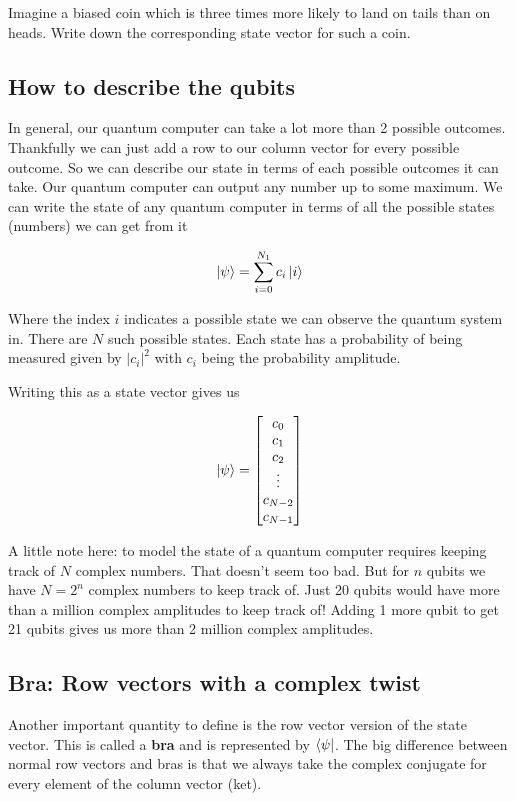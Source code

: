 \documentclass{book}
\begin{document}
Imagine a biased coin which is three times more likely to land on tails than on heads. Write down the corresponding state vector for such a coin.

\hline
\subsection{How to describe the qubits}

In general, our quantum computer can take a lot more than 2 possible outcomes. Thankfully we can just add a row to our column vector for every possible outcome. So we can describe our state in terms of each possible outcomes it can take. Our quantum computer can output any number up to some maximum.  We can write the state of any quantum computer in terms of all the possible states (numbers) we can get from it

$$
\ket{\psi} = \sum_{i = 0}^{N_1} c_i \ket{i}
$$


Where the index $i$ indicates a possible state we can observe the quantum system in. There are $N$ such possible states. Each state has a probability of being measured given by $|c_i|^2$  with $c_i$ being the probability amplitude. 

Writing this as a state vector gives us 

$$
\ket{\psi} = \begin{bmatrix} c_0 \\ c_1 \\ c_2 \\ \vdots \\ c_{N-2} \\ c_{N-1} \end{bmatrix}
$$

A little note here: to model the state of a quantum computer requires keeping track of $N$ complex numbers. That doesn't seem too bad.  But for $n$ qubits we have $N = 2^n$ complex numbers to keep track of. Just 20 qubits would have more than a million complex amplitudes to keep track of! Adding 1 more qubit to get 21 qubits gives us more than 2 million complex amplitudes. 


\subsection{ Bra: Row vectors with a complex twist }


Another important quantity to define is the row vector version of the state vector. This is called a \textbf{bra} and is represented by $\bra{\psi}$. The big difference between normal row vectors and bras is that we always take the complex conjugate for every element of the column vector (ket). 
\end{document}
